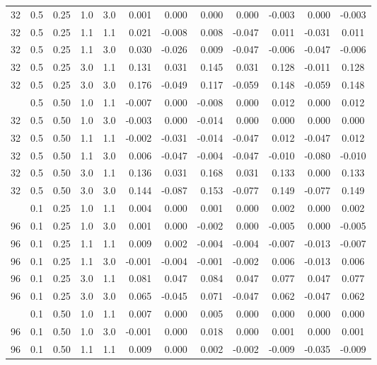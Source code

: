 \begin{longtable}[t]{cccccrrrrrrc}
32 & 0.5 & 0.25 & 1.0 & 3.0 & 0.001 & 0.000 & 0.000 & 0.000 & -0.003 & 0.000 & -0.003\\
32 & 0.5 & 0.25 & 1.1 & 1.1 & 0.021 & -0.008 & 0.008 & -0.047 & 0.011 & -0.031 & 0.011\\
32 & 0.5 & 0.25 & 1.1 & 3.0 & 0.030 & -0.026 & 0.009 & -0.047 & -0.006 & -0.047 & -0.006\\
32 & 0.5 & 0.25 & 3.0 & 1.1 & 0.131 & 0.031 & 0.145 & 0.031 & 0.128 & -0.011 & 0.128\\
32 & 0.5 & 0.25 & 3.0 & 3.0 & 0.176 & -0.049 & 0.117 & -0.059 & 0.148 & -0.059 & 0.148\\
\addlinespace
32 & 0.5 & 0.50 & 1.0 & 1.1 & -0.007 & 0.000 & -0.008 & 0.000 & 0.012 & 0.000 & 0.012\\
32 & 0.5 & 0.50 & 1.0 & 3.0 & -0.003 & 0.000 & -0.014 & 0.000 & 0.000 & 0.000 & 0.000\\
32 & 0.5 & 0.50 & 1.1 & 1.1 & -0.002 & -0.031 & -0.014 & -0.047 & 0.012 & -0.047 & 0.012\\
32 & 0.5 & 0.50 & 1.1 & 3.0 & 0.006 & -0.047 & -0.004 & -0.047 & -0.010 & -0.080 & -0.010\\
32 & 0.5 & 0.50 & 3.0 & 1.1 & 0.136 & 0.031 & 0.168 & 0.031 & 0.133 & 0.000 & 0.133\\
32 & 0.5 & 0.50 & 3.0 & 3.0 & 0.144 & -0.087 & 0.153 & -0.077 & 0.149 & -0.077 & 0.149\\
\addlinespace
96 & 0.1 & 0.25 & 1.0 & 1.1 & 0.004 & 0.000 & 0.001 & 0.000 & 0.002 & 0.000 & 0.002\\
96 & 0.1 & 0.25 & 1.0 & 3.0 & 0.001 & 0.000 & -0.002 & 0.000 & -0.005 & 0.000 & -0.005\\
96 & 0.1 & 0.25 & 1.1 & 1.1 & 0.009 & 0.002 & -0.004 & -0.004 & -0.007 & -0.013 & -0.007\\
96 & 0.1 & 0.25 & 1.1 & 3.0 & -0.001 & -0.004 & -0.001 & -0.002 & 0.006 & -0.013 & 0.006\\
96 & 0.1 & 0.25 & 3.0 & 1.1 & 0.081 & 0.047 & 0.084 & 0.047 & 0.077 & 0.047 & 0.077\\
96 & 0.1 & 0.25 & 3.0 & 3.0 & 0.065 & -0.045 & 0.071 & -0.047 & 0.062 & -0.047 & 0.062\\
\addlinespace
96 & 0.1 & 0.50 & 1.0 & 1.1 & 0.007 & 0.000 & 0.005 & 0.000 & 0.000 & 0.000 & 0.000\\
96 & 0.1 & 0.50 & 1.0 & 3.0 & -0.001 & 0.000 & 0.018 & 0.000 & 0.001 & 0.000 & 0.001\\
96 & 0.1 & 0.50 & 1.1 & 1.1 & 0.009 & 0.000 & 0.002 & -0.002 & -0.009 & -0.035 & -0.009\\

\end{longtable}
